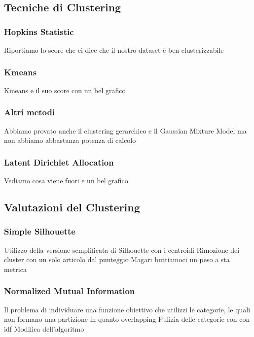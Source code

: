 \documentclass[
12pt, %
a4paper, %
oneside, %
headinclude,footinclude, %
BCOR5mm, %
]{scrartcl}
\begin{document}
	\subsection{Tecniche di Clustering}

		\subsubsection{Hopkins Statistic}

			Riportiamo lo score che ci dice che il nostro dataset è ben clusterizzabile

		\subsubsection{Kmeans}

			Kmeans e il suo score con un bel grafico

		\subsubsection{Altri metodi}

			Abbiamo provato anche il clustering gerarchico e il Gaussian Mixture Model
			ma non abbiamo abbastanza potenza di calcolo

		\subsubsection{Latent Dirichlet Allocation}

			Vediamo cosa viene fuori e un bel grafico


	\subsection{Valutazioni del Clustering}

		\subsubsection{Simple Silhouette}

			Utilizzo della versione semplificata di Silhouette con i centroidi
			Rimozione dei cluster con un solo articolo dal punteggio
			Magari buttiamoci un peso a sta metrica

		\subsubsection{Normalized Mutual Information}

			Il problema di individuare una funzione obiettivo che utilizzi le categorie,
			le quali non formano una partizione in quanto overlapping
			Pulizia delle categorie con con idf
			Modifica dell'algoritmo
\end{document}
